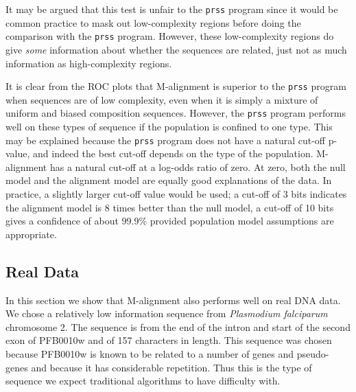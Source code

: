 \documentclass[letterpaper,11pt,oneside]{article}
\begin{document}
\begin{multicols}{2}
It may be argued that this test is unfair to the \verb!prss! program since it
would be common practice to mask out low-complexity regions before doing the
comparison with the \verb!prss! program.  However, these low-complexity
regions do give \emph{some} information about whether the sequences are
related, just not as much information as high-complexity regions.



It is clear from the ROC plots that M-alignment is superior to
the \verb!prss! program when sequences are of low complexity, even when it is
simply a mixture of uniform and biased composition sequences.  However, the
\verb!prss! program performs well on these types of sequence if the population
is confined to one type.  This may be explained because the \verb!prss!
program does not have a natural cut-off p-value, and indeed the best cut-off
depends on the type of the population.  M-alignment has a natural cut-off at a
log-odds ratio of zero.  At zero, both the null model and the alignment model
are equally good explanations of the data.  In practice, a slightly larger
cut-off value would be used; a cut-off of 3 bits indicates the alignment model
is 8 times better than the null model, a cut-off of 10 bits gives a confidence
of about 99.9\% provided population model assumptions are appropriate.


\subsection{Real Data}

In this section we show that M-alignment also performs well on real DNA data.
We chose a relatively low information sequence from \emph{Plasmodium
falciparum} chromosome 2.  The sequence is from the end of the intron and
start of the second exon of PFB0010w and of 157 characters in length.  This
sequence was chosen because PFB0010w is known to be related to a number of
genes and pseudo-genes and because it has considerable repetition.  Thus this
is the type of sequence we expect traditional algorithms to have difficulty
with.



\end{multicols}
\end{document}

